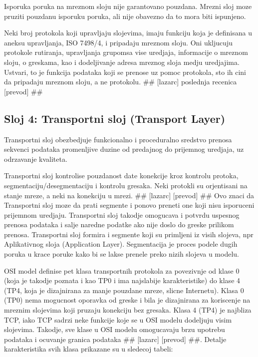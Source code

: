 \documentclass[a4paper,12pt, master]{etf}
\begin{document}
	Isporuka poruka na mreznom sloju nije garantovano pouzdana. Mrezni sloj moze pruziti pouzdanu
	isporuku poruka, ali nije obavezno da to mora biti ispunjeno.

	Neki broj protokola koji upravljaju slojevima, imaju funkciju koja je definisana u aneksu
	upravljanja, ISO 7498/4, i pripadaju mreznom sloju. Oni ukljucuju protokole rutiranja,
	upravljanja grupomsa vise uredjaja, informacije o mreznom sloju, o greskama, kao i dodeljivanje
	adresa mreznog sloja medju uredjajima. Ustvari, to je funkcija podataka koji se prenose uz
	pomoc protokola, sto ih cini da pripadaju mreznom sloju, a ne protokolu. \#\# [lazarc] poslednja
	recenica [prevod] \#\#

	\subsection{Sloj 4: Transportni sloj (Transport Layer)}

	Transportni sloj obezbedjuje funkcionalno i proceduralno sredstvo prenosa sekvenci podataka
	promenljive duzine od predajnog do prijemnog uredjaja, uz odrzavanje kvaliteta.

	Transportni sloj kontrolise pouzdanost date konekcije kroz kontrolu protoka,
	segmentaciju/desegmentaciju i kontrolu gresaka. Neki protokli su orjentisani na stanje mreze, a
	neki na konekciju u mrezi. \#\# [lazarc] [prevod] \#\# Ovo znaci da Transportni sloj moze da prati
	segmente i ponovo preneti one koji nisu isporuceni prijemnom uredjaju. Transportni sloj takodje
	omogucava i potvrdu uspesnog prenosa podataka i salje naredne podatke ako nije doslo do greske
	prilikom prenosa. Transportni sloj formira i segmente koji su primljeni iz visih slojeva, npr
	Aplikativnog sloja (Application Layer). Segmentacija je proces podele dugih poruka u krace
	poruke kako bi se lakse prenele preko nizih slojeva u modelu.

	OSI model definise pet klasa transportnih protokola za povezivnje od klase 0 (koja je takodje
	poznata i kao TP0 i ima najslabije karakteristike) do klase 4 (TP4, koja je dizajnirana za
	manje pouzdane mreze, slicne Internetu). Klasa 0 (TP0) nema mogucnost oporavka od greske i bila
	je dizajnirana za koriscenje na mreznim slojevima koji pruzaju konekciju bez gresaka. Klasa 4
	(TP4) je najbliza TCP, iako TCP sadrzi neke funkcije koje se u OSI modelu dodeljuju visim
	slojevima. Takodje, sve klase u OSI modelu omogucavaju brzu upotrebu podataka i ocuvanje
	granica podataka \#\# [lazarc] [prevod] \#\#. Detalje karakteristika svih klasa prikazane su u
	sledecoj tabeli:
\end{document}
